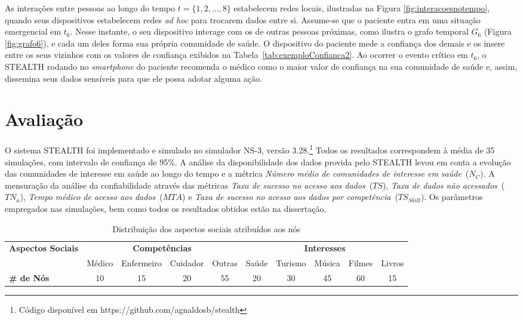 \documentclass[12pt]{article}
\newcommand{\agn}[1]{\textcolor{auburn}{#1}}
\begin{document}
As interações entre pessoas ao longo do tempo $t = \{1,2,...,8\}$
estabelecem redes locais, ilustradas na Figura \ref{fig:interacoesnotempo}, quando seus dispositivos estabelecem redes \textit{ad hoc} para trocarem dados entre si. Assume-se que o paciente entra em uma situação emergencial em $t_6$. Nesse instante, o seu dispositivo interage com os de outras pessoas próximas, como ilustra o grafo temporal $G_6$ (Figura \ref{fig:grafo6}), e cada um deles forma sua própria comunidade de saúde. O dispositivo do paciente mede a confiança dos demais e os insere entre os seus vizinhos com os valores de confiança exibidos na  Tabela~\ref{tab:exemploConfianca2}. Ao ocorrer o evento crítico em $t_6$, o \mbox{STEALTH} rodando no \textit{smartphone} do paciente recomenda o médico como o maior valor de confiança na sua comunidade de saúde e, assim, dissemina seus dados sensíveis para que ele possa adotar alguma ação.

\section{Avaliação} \label{sec:aval}

O sistema \mbox{STEALTH} foi implementado e simulado no simulador NS-3, versão 3.28.\footnote{Código disponível em https://github.com/agnaldosb/stealth} Todos os resultados correspondem à média de 35 simulações, com intervalo de confiança de 95\%. A análise da disponibilidade dos dados provida pelo \mbox{STEALTH} levou em conta a evolução das comunidades de interesse em saúde ao longo do tempo e a métrica \textit{Número médio de comunidades de interesse em saúde}~($N_{C}$). A
\agn{mensuração da}
análise da confiabilidade
através das métricas \textit{Taxa de sucesso no acesso aos dados}~($TS$), \textit{Taxa de dados não acessados}~($TN_a$), \textit{Tempo médico de acesso aos dados}~($MTA$) e \textit{Taxa de sucesso no acesso aos dados por competência}~($TS_{Skill}$). Os parâmetros empregados nas simulações, bem como todos os resultados obtidos estão na dissertação.

\begin{table}[H]
\setlength{\extrarowheight}{2.0pt}
\centering
\caption{Distribuição dos aspectos sociais atribuídos aos nós}
\vspace{-0.2cm}
\label{tab:aspectosAtribuidos}
\begin{tabular}{|l|cccc|ccccc|}
\hline%
\multirow{2}{*}{\textbf{Aspectos Sociais}} & \multicolumn{4}{c|}{\textbf{Competências}} & \multicolumn{5}{c|}{\textbf{Interesses}} \\ \cline{2-10}
&Médico&Enfermeiro&Cuidador&Outras&Saúde&Turismo&Música&Filmes&Livros \\ \hline
\textbf{\# de Nós} &10&15&20&55&20&30&45&60&15 \\ 
\hline%
\end{tabular}
\end{table}
\end{document}
